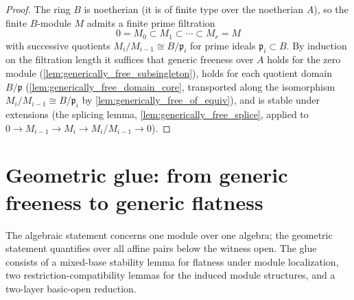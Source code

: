\begin{proof}
\leanok
  The ring \(B\) is noetherian (it is of finite type over the noetherian
  \(A\)), so the finite \(B\)-module \(M\) admits a finite prime filtration
  \[
    0 = M_0 \subset M_1 \subset \cdots \subset M_r = M
  \]
  with successive quotients \(M_i / M_{i-1} \cong B / \mathfrak{p}_i\) for
  prime ideals \(\mathfrak{p}_i \subset B\).  By induction on the filtration
  length it suffices that generic freeness over \(A\) holds for the zero
  module (\cref{lem:generically_free_subsingleton}), holds for each quotient
  domain \(B/\mathfrak{p}\) (\cref{lem:generically_free_domain_core},
  transported along the isomorphism \(M_i/M_{i-1} \cong B/\mathfrak{p}_i\) by
  \cref{lem:generically_free_of_equiv}), and is stable under extensions
  (the splicing lemma, \cref{lem:generically_free_splice}, applied to
  \(0 \to M_{i-1} \to M_i \to M_i/M_{i-1} \to 0\)).
\end{proof}

\section{Geometric glue: from generic freeness to generic flatness}

The algebraic statement concerns one module over one algebra; the geometric
statement quantifies over all affine pairs below the witness open. The glue
consists of a mixed-base stability lemma for flatness under module
localization, two restriction-compatibility lemmas for the induced module
structures, and a two-layer basic-open reduction.

